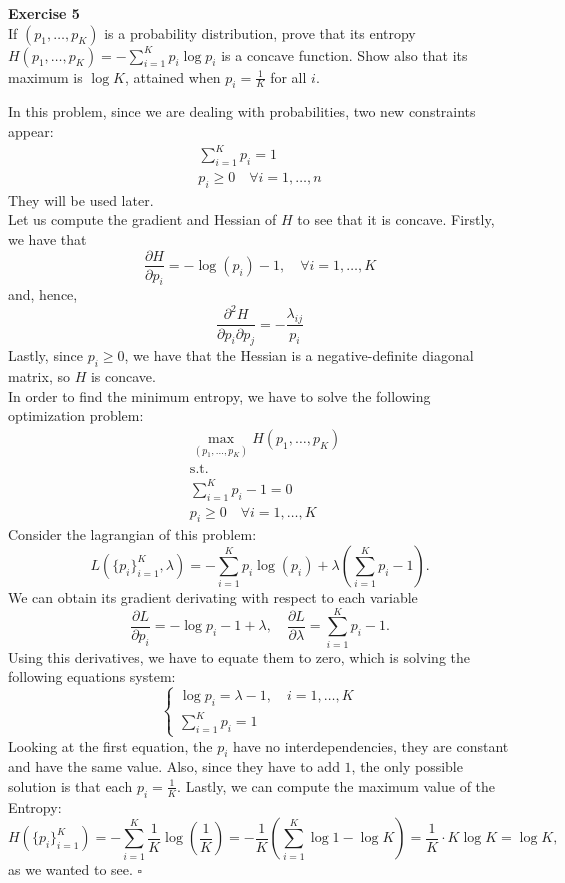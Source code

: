 \documentclass[11pt,table]{article}
\newcommand{\qed}{\hfill $\square$}
\newenvironment{problem}[2][Exercise]
    { \begin{mdframed}[backgroundcolor=gray!20] \textbf{#1 #2} \\}
    {  \end{mdframed}}
\begin{document}
\begin{problem}{5}
If \( (p_1,\dots,p_K) \) is a probability distribution, prove that its entropy \( H(p_1, \dots, p_K) = - \sum_{i=1}^K p_i \log p_i\) is a concave function. Show also that its maximum is \( \log K \), attained when \( p_i = \frac{1}{K}\) for all $i$.
\end{problem}


In this problem, since we are dealing with probabilities, two new constraints appear:
\begin{align*}
  \sum_{i=1}^K p_i = 1 \\
  p_i \geq 0 \quad \forall i =1,\dots,n
\end{align*}
They will be used later.\\

Let us compute the gradient and Hessian of \(H\) to see that it is concave. Firstly, we have that
\[
  \frac{\partial H}{\partial p_i} = - \log(p_i) - 1, \quad \forall i = 1,\dots,K
\]
and, hence,
\[
  \frac{\partial^2 H}{\partial p_i \partial p_j} = - \frac{\lambda_{ij}}{p_i}
\]
Lastly, since \(p_i \geq 0\), we have that the Hessian is a negative-definite diagonal matrix, so \(H\) is concave.\\

In order to find the minimum entropy, we have to solve the following optimization problem:
\begin{align*}
   & \max_{(p_1,\dots,p_K)} H(p_1,\dots,p_K) \\
   & \text{s.t.}                             \\
   & \sum_{i=1}^K p_i -1 = 0                 \\
   & p_i \geq 0 \quad \forall i =1,\dots,K
\end{align*}
Consider the lagrangian of this problem:
\[
  L\left(\{p_i\}_{i=1}^K, \lambda\right) = - \sum_{i=1}^K p_i \log(p_i) + \lambda\left(\sum_{i=1}^K p_i -1\right).
\]
We can obtain its gradient derivating with respect to each variable
\[
  \frac{\partial L}{\partial p_i} = - \log p_i - 1 + \lambda, \quad \frac{\partial L}{\partial \lambda} =  \sum_{i=1}^K p_i -1.
\]
Using this derivatives, we have to equate them to zero, which is solving the following equations system:
\[
  \begin{cases}
    \log p_i = \lambda - 1, \quad i = 1,\dots,K \\
    \sum_{i=1}^K p_i = 1
  \end{cases}
\]
Looking at the first equation, the \(p_i\) have no interdependencies, they are constant and have the same value. Also, since they have to add \(1\), the only possible solution is that each \(p_i = \frac{1}{K}\). Lastly, we can compute the maximum value of the Entropy:
\[
  H\left(\{p_i\}_{i=1}^K\right) = - \sum_{i=1}^K \frac{1}{K} \log \left(\frac{1}{K}\right)  = - \frac{1}{K} \left(\sum_{i=1}^K \log 1 - \log K\right) = \frac{1}{K} \cdot K \log K = \log K,
\]
as we wanted to see. \qed
\end{document}
